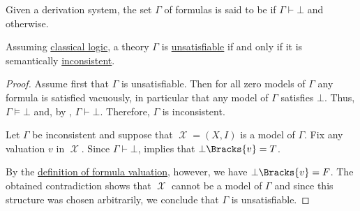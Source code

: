 \begin{definition}\label{def:first_order_theory_consistency}
  Given a derivation system, the set \( \Gamma \) of formulas is said to be  if \( \Gamma \vdash \bot \) and  otherwise.
\end{definition}

\begin{proposition}\label{thm:formulas_unsatisfiable_iff_inconsistent}
   Assuming \hyperref[def:classical_logic]{classical logic}, a theory \( \Gamma \) is \hyperref[def:propositional_semantics/satisfiability]{unsatisfiable} if and only if it is semantically \hyperref[def:first_order_theory_consistency]{inconsistent}.
\end{proposition}
\begin{proof}
  \SufficiencySubProof Assume first that \( \Gamma \) is unsatisfiable. Then for all zero models of \( \Gamma \) any formula is satisfied vacuously, in particular that any model of \( \Gamma \) satisfies \( \bot \). Thus, \( \Gamma \vDash \bot \) and, by , \( \Gamma \vdash \bot \). Therefore, \( \Gamma \) is inconsistent.

  \NecessitySubProof Let \( \Gamma \) be inconsistent and suppose that \( \mscrX = (X, I) \) is a model of \( \Gamma \). Fix any valuation \( v \) in \( \mscrX \). Since \( \Gamma \vdash \bot \),  implies that \( \bot\Bracks{v} = T \).

  By the \hyperref[def:first_order_valuation/formula_valuation]{definition of formula valuation}, however, we have \( \bot\Bracks{v} = F \). The obtained contradiction shows that \( \mscrX \) cannot be a model of \( \Gamma \) and since this structure was chosen arbitrarily, we conclude that \( \Gamma \) is unsatisfiable.
\end{proof}

